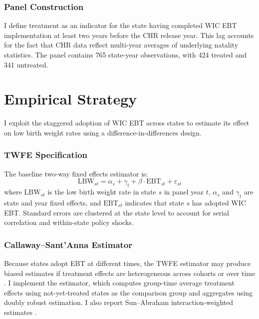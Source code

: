 \documentclass[12pt]{article}
\begin{document}
\subsubsection*{Panel Construction} I define treatment as an indicator for the state having completed WIC EBT implementation at least two years before the CHR release year. This lag accounts for the fact that CHR data reflect multi-year averages of underlying natality statistics. The panel contains 765 state-year observations, with 424 treated and 341 untreated.



\section{Empirical Strategy}

I exploit the staggered adoption of WIC EBT across states to estimate its effect on low birth weight rates using a difference-in-differences design.

\subsubsection*{TWFE Specification} The baseline two-way fixed effects estimator is:
\begin{equation}
\text{LBW}_{st} = \alpha_s + \gamma_t + \beta \cdot \text{EBT}_{st} + \varepsilon_{st}
\label{eq:twfe}
\end{equation}
where $\text{LBW}_{st}$ is the low birth weight rate in state $s$ in panel year $t$, $\alpha_s$ and $\gamma_t$ are state and year fixed effects, and $\text{EBT}_{st}$ indicates that state $s$ has adopted WIC EBT. Standard errors are clustered at the state level to account for serial correlation and within-state policy shocks.

\subsubsection*{Callaway--Sant'Anna Estimator} Because states adopt EBT at different times, the TWFE estimator may produce biased estimates if treatment effects are heterogeneous across cohorts or over time \citep{goodman2021, sun2021}. I implement the \citet{callaway2021} estimator, which computes group-time average treatment effects using not-yet-treated states as the comparison group and aggregates using doubly robust estimation. I also report Sun--Abraham interaction-weighted estimates \citep{sun2021}.
\end{document}

